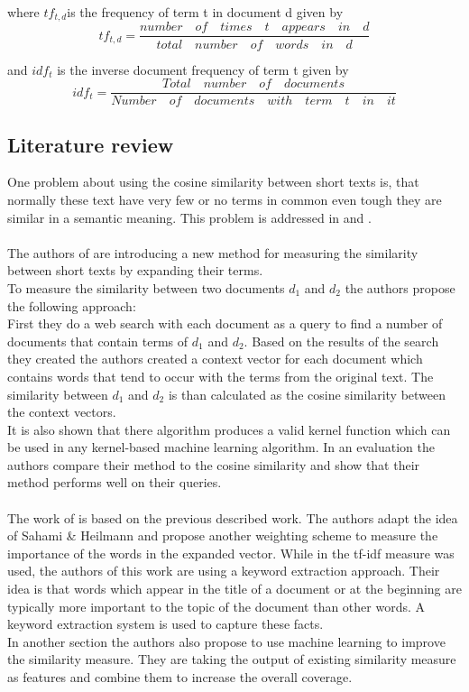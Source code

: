 where $tf_{t,d}$is the  frequency of term t in document d given by
\begin{equation}
tf_{t,d} = \dfrac{number \quad  of \quad  times \quad   t \quad  appears \quad  in \quad   d}{total \quad number  \quad  of \quad  words \quad  in \quad  d}
\end{equation}

and $idf_{t}$ is the inverse document frequency of term t given by
\begin{equation}
idf_{t} = \dfrac{Total \quad number \quad  of  \quad documents}{Number \quad  of \quad  documents \quad  with \quad  term \quad t \quad  in  \quad it}
\end{equation}

\subsection{Literature review}
One problem about using the cosine similarity between short texts is, that normally these text have very few  or no terms in common even tough they are similar in a semantic meaning. This problem is addressed in \cite{similarity1} and \cite{similarity2}. \\
~\\
The authors of \cite{similarity1} are introducing a new method for measuring the similarity between short texts by expanding their terms. \\
To measure the similarity between two documents $d_1$ and $d_2$ the authors propose the following approach: \\
First they do a web search with each document as a query to find a number of documents that contain terms of $d_1$ and $d_2$. Based on the results of the search they created the authors created  a context vector for each document which contains words that tend to occur with the terms from the original text. The similarity between $d_1$ and $d_2$ is than calculated as the cosine similarity between the context vectors. \\
It is also shown that there algorithm produces a valid kernel function which can be used in any kernel-based machine learning algorithm. In an evaluation the authors compare their method to the cosine similarity and show that their method performs well on their queries. \\
~\\
The work of \cite{similarity2} is based on the previous described work. The authors adapt the idea of Sahami \& Heilmann and propose another weighting scheme to measure the importance of the words in the expanded vector. While in \cite{similarity1} the tf-idf measure was used, the authors of this work are using a keyword extraction approach. Their idea is that words which appear in the title of a document or at the beginning are typically more important to the topic of the document than other words. A keyword extraction system is used to capture these facts. \\
In another section the authors also propose to use machine learning to improve the similarity measure. They are taking the output of existing similarity measure as features and combine them to increase the overall coverage. 


